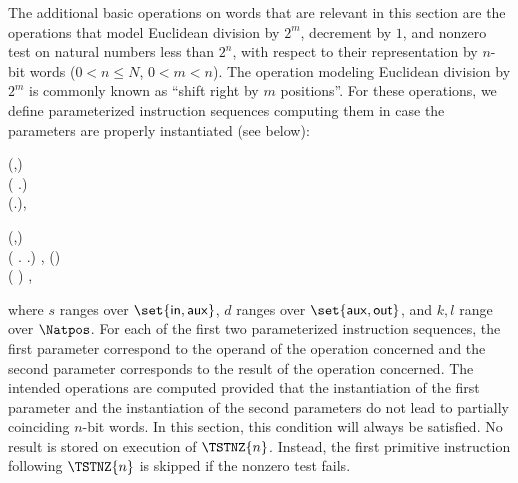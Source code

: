 \documentclass{llncs}
\begin{document}
The additional basic operations on words that are relevant in this 
section are the operations that model Euclidean division by $2^m$,
decrement by $1$, and nonzero test on natural numbers less than $2^n$, 
with respect to their representation by $n$-bit words ($0 < n \leq N$, 
$0 < m < n$).
The operation modeling Euclidean division by $2^m$ is commonly known as 
``shift right by $m$ positions''.
For these operations, we define parameterized instruction sequences 
computing them in case the parameters are properly instantiated (see 
below):
\begin{ldispl}
(,) \deq {}
\\ \quad
{} 
 ( \conc 
   \conc
  .\setbr{\False}) \conc {}
\\[.5ex] \quad
{} (.\setbr{\False})\;,
 \end{ldispl}\begin{ldispl}
(,) \deq {}
\\ \quad
{} 
 ( \conc {} \conc
  .\setbr{\False} \conc {} \conc
  .\setbr{\True}) \conc
{} \conc {} \conc {}\;,
\eqnsep
{}() \deq {}
\\ \quad
{} 
 ( \conc {}) \conc {}\;, 
\end{ldispl}where 
$s$ ranges over $\set{\mathsf{in},\mathsf{aux}}$, 
$d$ ranges over $\set{\mathsf{aux},\mathsf{out}}$, and
$k,l$ range over $\Natpos$.
For each of the first two parameterized instruction sequences, the first 
parameter correspond to the operand of the operation concerned and the 
second parameter corresponds to the result of the operation concerned.
The intended operations are computed provided that the instantiation of 
the first parameter and the instantiation of the second parameters do 
not lead to partially coinciding $n$-bit words.
In this section, this condition will always be satisfied.
No result is stored on execution of $\TSTNZ{n}$.
Instead, the first primitive instruction following $\TSTNZ{n}$ is 
skipped if the nonzero test fails.
\end{document}

